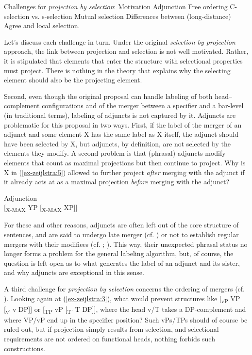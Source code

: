 \documentclass[output=paper
,modfonts
,nonflat]{langsci/langscibook}
\begin{document}
\begin{exe}
\ex Challenges for \textit{projection by selection}:
	\xlist
	\ex Motivation
	\ex Adjunction
	\ex Free ordering
	\ex C-selection vs. s-selection
	\ex Mutual selection
	\ex Differences between (long-distance) Agree and local selection.
	\endxlist
\end{exe}
Let’s discuss each challenge in turn. Under the original \textit{selection by projection} approach, the link between projection and selection is not well motivated. Rather, it is stipulated that elements that enter the structure with selectional properties must project. There is nothing in the theory that explains why the selecting element should also be the projecting element.  

Second, even though the original proposal can handle labeling of both head–complement configurations and of the merger between a specifier and a bar-level (in traditional terms), labeling of adjuncts is not captured by it. Adjuncts are problematic for this proposal in two ways. First, if the label of the merger of an adjunct and some element X has the same label as X itself, the adjunct should have been selected by X, but adjuncts, by definition, are not selected by the elements they modify. A second problem is that (phrasal) adjuncts modify elements that count as maximal projections but then continue to project. Why is X in (\ref{ex-zeijlstra:5}) allowed to further project \textit{after} merging with the adjunct if it already acts at as a maximal projection \textit{before} merging with the adjunct?  

\begin{exe}
\ex Adjunction \label{ex-zeijlstra:5} \\
	{[}\textsubscript{X-MAX} YP {[}\textsubscript{X-MAX} XP{]}{]}
\end{exe}
For these and other reasons, adjuncts are often left out of the core structure of sentences, and are said to undergo late merger (cf. \citealt{Lebeaux1988}) or not to establish regular mergers with their modifiees (cf. \citealt{Chomsky2001}; \citealt{Hornstein_Nunes2009}). This way, their unexpected phrasal status no longer forms a problem for the general labeling algorithm, but, of course, the question is left open as to what generates the label of an adjunct and its sister, and why adjuncts are exceptional in this sense.

A third challenge for \textit{projection by selection} concerns the ordering of mergers (cf. \citealt{Adger2013}). Looking again at (\ref{ex-zeijlstra:3}), what would prevent structures like {[}\textsubscript{vP} VP {[}\textsubscript{v'} v DP{]}{]} or {[}\textsubscript{TP} vP {[}\textsubscript{T'} T DP{]}{]}, where the head v/T takes a DP-complement and where VP/vP end up in the specifier position? Such vPs/TPs should of course be ruled out, but if projection simply results from selection, and selectional requirements are not ordered on functional heads, nothing forbids such constructions.
\end{document}

